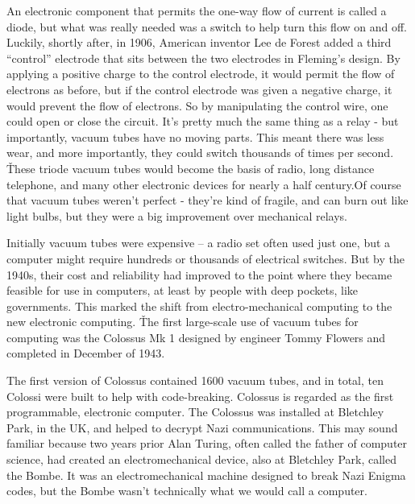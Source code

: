 An electronic component that permits the one-way flow of current is called a diode, but what was really needed was a
switch to help turn this flow on and off. Luckily, shortly after, in 1906, American inventor Lee de Forest added a
third ``control'' electrode that sits between the two electrodes in Fleming's design. By applying a positive charge
to the control electrode, it would permit the flow of electrons as before, but if the control electrode was given a
negative charge, it would prevent the flow of electrons. So by manipulating the control wire, one could open or close
the circuit. It's pretty much the same thing as a relay - but importantly, vacuum tubes have no moving parts. This
meant there was less wear, and more importantly, they could switch thousands of times per second. \v

These triode vacuum tubes would become the basis of radio, long distance telephone, and many other electronic devices
for nearly a half century.Of course that vacuum tubes weren't perfect - they're kind of fragile, and can burn out
like light bulbs, but they were a big improvement over mechanical relays.


Initially vacuum tubes were expensive – a radio set often used just one, but a computer might require hundreds or
thousands of electrical switches. But by the 1940s, their cost and reliability had improved to the point where they
became feasible for use in computers, at least by people with deep pockets, like governments. This marked the shift
from electro-mechanical computing to the new electronic computing. \v

The first large-scale use of vacuum tubes for computing was the Colossus Mk 1 designed by engineer Tommy Flowers and
completed in December of 1943.


The first version of Colossus contained 1600 vacuum tubes, and in total, ten Colossi were built to help with
code-breaking. Colossus is regarded as the first programmable, electronic computer. The Colossus was installed at
Bletchley Park, in the UK, and helped to decrypt Nazi communications. This may sound familiar because two years prior
Alan Turing, often called the father of computer science, had created an electromechanical device, also at Bletchley
Park, called the Bombe. It was an electromechanical machine designed to break Nazi Enigma codes, but the Bombe wasn't
technically what we would call a computer.


